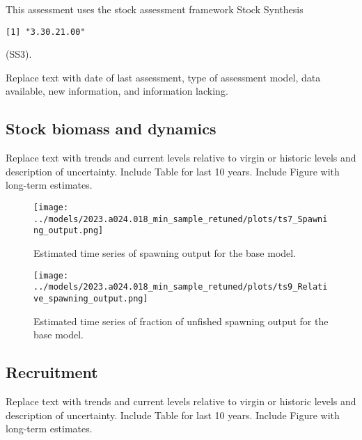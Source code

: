 \documentclass[11pt,
  english,
  letterpaper,
]{article}
\begin{document}
This assessment uses the stock assessment framework Stock Synthesis

\begin{verbatim}
[1] "3.30.21.00"
\end{verbatim}

(SS3).

Replace text with date of last assessment, type of assessment model, data available, new information, and information lacking.

\hypertarget{stock-biomass-and-dynamics}{%
\subsection*{Stock biomass and dynamics}\label{stock-biomass-and-dynamics}}

Replace text with trends and current levels relative to virgin or historic levels and description of uncertainty. Include Table for last 10 years. Include Figure with long-term estimates.



\begin{figure}
\centering
\texttt{[image: ../models/2023.a024.018\_min\_sample\_retuned/plots/ts7\_Spawning\_output.png]}
\caption{Estimated time series of spawning output for the base model.\label{fig:es-ssb}}
\end{figure}

\begin{figure}
\centering
\texttt{[image: ../models/2023.a024.018\_min\_sample\_retuned/plots/ts9\_Relative\_spawning\_output.png]}
\caption{Estimated time series of fraction of unfished spawning output for the base model.\label{fig:es-depl}}
\end{figure}

\clearpage

\hypertarget{recruitment}{%
\subsection*{Recruitment}\label{recruitment}}

Replace text with trends and current levels relative to virgin or historic levels and description of uncertainty. Include Table for last 10 years. Include Figure with long-term estimates.


\end{document}
